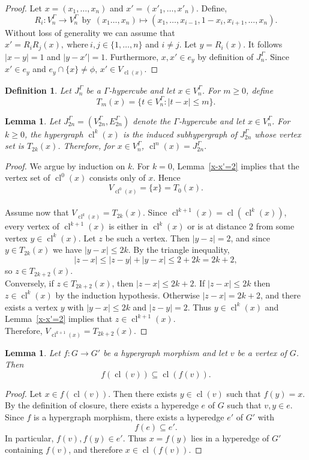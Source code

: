 \documentclass[11pt]{amsart}
\newtheorem{Def}[subsection]{Definition}
\newtheorem{lem}[subsection]{Lemma}
\newcommand{\cl}{\operatorname{cl}}
\begin{document}
\begin{proof}
Let $x=(x_1,\ldots,x_n)$ and $x'=(x'_1,\ldots,x'_n)$. Define, 
\[R_i:V_n^\Gamma\rightarrow V_n^\Gamma ~~\text{by}~~ (x_1\ldots,x_n)\mapsto (x_1,\ldots,x_{i-1},1-x_i,x_{i+1},\ldots,x_n) .\]
Without loss of generality we can assume that $x'=R_i R_j(x),~ \text{where}~i,j\in \{1,\ldots,n\}$ and $i\ne j$. Let $y=R_i(x)$. It follows $|x-y|=1$ and $|y-x'|=1$. Furthermore, $x,x'\in e_y$ by definition of $J_n^\Gamma.$ Since $x'\in e_y$ and $e_y\cap \{x\}\neq \phi$, $x'\in V_{\cl(x)}.$
\end{proof}


\begin{Def}
Let $J_n^\Gamma$ be a $\Gamma$-hypercube and let $x \in V_n^\Gamma$.
For $m\ge 0$, define
\[
T_m(x)=\{t\in V_n^\Gamma : |t-x|\le m\}.
\]
\end{Def}
%
\begin{lem}\label{closure and T_m}
Let $J_{2n}^\Gamma=(V_{2n}^\Gamma,E_{2n}^\Gamma)$ denote the $\Gamma$-hypercube
and let $x\in V_n^\Gamma$. For $k\ge0$, the hypergraph $\cl^k(x)$ is the induced subhypergraph
of $J_{2n}^\Gamma$ whose vertex set is $T_{2k}(x)$. Therefore, for $x\in V_n^\Gamma$, $\cl^n(x)=J_{2n}^\Gamma.$
\end{lem}
    \begin{proof}
We argue by induction on $k$.
%
For $k=0$, Lemma~\ref{x-x'=2} implies that the vertex set of
$\cl^0(x)$ consists only of $x$. Hence
\[
V_{\cl^0(x)}=\{x\}=T_0(x).
\]
\\
Assume now that $V_{\cl^k(x)}=T_{2k}(x)$.
Since $\cl^{k+1}(x)=\cl(\cl^k(x))$, every vertex of $\cl^{k+1}(x)$
is either in $\cl^k(x)$ or is at distance $2$ from some vertex
$y\in \cl^k(x)$.
Let $z$ be such a vertex. Then $|y-z|=2$, and since
$y\in T_{2k}(x)$ we have $|y-x|\le 2k$.
By the triangle inequality,
\[
|z-x|\le |z-y|+|y-x|\le 2+2k=2k+2,
\]
so $z\in T_{2k+2}(x)$.
\\
Conversely, if $z\in T_{2k+2}(x)$, then $|z-x|\le 2k+2$.
If $|z-x|\le 2k$ then $z\in\cl^k(x)$ by the induction hypothesis.
Otherwise $|z-x|=2k+2$, and there exists a vertex $y$
with $|y-x|\le 2k$ and $|z-y|=2$.
Thus $y\in\cl^k(x)$ and Lemma~\ref{x-x'=2} implies that
$z\in\cl^{k+1}(x)$.
\\
Therefore, $V_{\cl^{k+1}(x)}=T_{2k+2}(x)$.
\end{proof}

\begin{lem}\label{cl of vertex}
Let $f: G\to G'$ be a hypergraph morphism and let $v$ be a vertex of $G$.
Then
\[
f(\cl(v))\subseteq \cl(f(v)).
\]
\end{lem}
%
\begin{proof}
Let $x\in f(\cl(v))$. Then there exists $y\in \cl(v)$ such that
$f(y)=x$.\\
%
By the definition of closure, there exists a hyperedge $e$ of $G$
such that $v,y\in e$.
Since $f$ is a hypergraph morphism, there exists a hyperedge
$e'$ of $G'$ with
\[
f(e)\subseteq e'.
\]
In particular, $f(v),f(y)\in e'$.
Thus $x=f(y)$ lies in a hyperedge of $G'$ containing $f(v)$,
and therefore $x\in \cl(f(v))$.
\end{proof}
\end{document}
